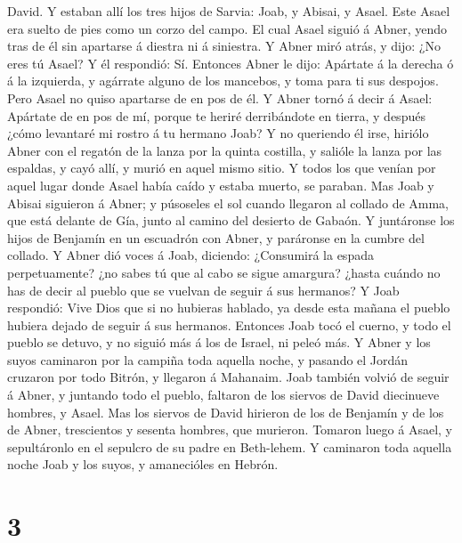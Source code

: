 David.  Y estaban allí los tres hijos de Sarvia: Joab, y
Abisai, y Asael. Este Asael era suelto de pies como un corzo del campo.
 El cual Asael siguió á Abner, yendo tras de él sin
apartarse á diestra ni á siniestra.  Y Abner miró atrás,
y dijo: ¿No eres tú Asael? Y él respondió: Sí.  Entonces
Abner le dijo: Apártate á la derecha ó á la izquierda, y agárrate alguno
de los mancebos, y toma para ti sus despojos. Pero Asael no quiso
apartarse de en pos de él.  Y Abner tornó á decir á
Asael: Apártate de en pos de mí, porque te heriré derribándote en
tierra, y después ¿cómo levantaré mi rostro á tu hermano Joab?
 Y no queriendo él irse, hiriólo Abner con el regatón de
la lanza por la quinta costilla, y salióle la lanza por las espaldas, y
cayó allí, y murió en aquel mismo sitio. Y todos los que venían por
aquel lugar donde Asael había caído y estaba muerto, se paraban.
 Mas Joab y Abisai siguieron á Abner; y púsoseles el sol
cuando llegaron al collado de Amma, que está delante de Gía, junto al
camino del desierto de Gabaón.  Y juntáronse los hijos de
Benjamín en un escuadrón con Abner, y paráronse en la cumbre del
collado.  Y Abner dió voces á Joab, diciendo: ¿Consumirá
la espada perpetuamente? ¿no sabes tú que al cabo se sigue amargura?
¿hasta cuándo no has de decir al pueblo que se vuelvan de seguir á sus
hermanos?  Y Joab respondió: Vive Dios que si no hubieras
hablado, ya desde esta mañana el pueblo hubiera dejado de seguir á sus
hermanos.  Entonces Joab tocó el cuerno, y todo el pueblo
se detuvo, y no siguió más á los de Israel, ni peleó más.
 Y Abner y los suyos caminaron por la campiña toda
aquella noche, y pasando el Jordán cruzaron por todo Bitrón, y llegaron
á Mahanaim.  Joab también volvió de seguir á Abner, y
juntando todo el pueblo, faltaron de los siervos de David diecinueve
hombres, y Asael.  Mas los siervos de David hirieron de
los de Benjamín y de los de Abner, trescientos y sesenta hombres, que
murieron. Tomaron luego á Asael, y sepultáronlo en el sepulcro de su
padre en Beth-lehem.  Y caminaron toda aquella noche Joab
y los suyos, y amanecióles en Hebrón.

\hypertarget{section-2}{%
\section{3}\label{section-2}}

